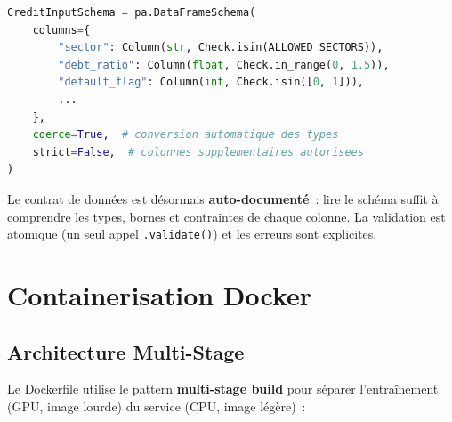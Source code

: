 \documentclass[12pt,a4paper]{article}
\begin{document}
\begin{formulebox}
\begin{lstlisting}[language=Python]
CreditInputSchema = pa.DataFrameSchema(
    columns={
        "sector": Column(str, Check.isin(ALLOWED_SECTORS)),
        "debt_ratio": Column(float, Check.in_range(0, 1.5)),
        "default_flag": Column(int, Check.isin([0, 1])),
        ...
    },
    coerce=True,  # conversion automatique des types
    strict=False,  # colonnes supplementaires autorisees
)
\end{lstlisting}
\end{formulebox}

\begin{interpretbox}
Le contrat de donn\'ees est d\'esormais \textbf{auto-document\'e}~: lire le sch\'ema suffit \`a comprendre les types, bornes et contraintes de chaque colonne. La validation est atomique (un seul appel \texttt{.validate()}) et les erreurs sont explicites.
\end{interpretbox}


\section{Containerisation Docker}
\label{sec:docker}

\subsection{Architecture Multi-Stage}

Le Dockerfile utilise le pattern \textbf{multi-stage build} pour s\'eparer l'entra\^inement (GPU, image lourde) du service (CPU, image l\'eg\`ere)~:

\begin{center}
\end{center}
\end{document}
